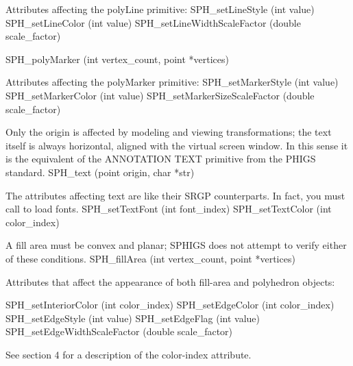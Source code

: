 \newpar
Attributes affecting the polyLine primitive:
\begincode
SPH_setLineStyle (int value)  \elementgenerator  {}
SPH_setLineColor (int value)  \elementgenerator
SPH_setLineWidthScaleFactor (double scale_factor)  \elementgenerator
\endcode


\begincode
SPH_polyMarker (int vertex_count, point *vertices) \elementgenerator
\endcode

\newpar
Attributes affecting the polyMarker primitive:
\begincode
SPH_setMarkerStyle (int value)  \elementgenerator  {}
SPH_setMarkerColor (int value)  \elementgenerator
SPH_setMarkerSizeScaleFactor (double scale_factor)  \elementgenerator
\endcode


Only the origin is affected by modeling and viewing transformations;
the text itself is always horizontal, aligned with the virtual screen
window.  In this sense it is the equivalent of the ANNOTATION TEXT
primitive from the PHIGS standard.
\begincode
SPH_text (point origin, char *str) \elementgenerator
\endcode

\newpar
The attributes affecting text are like their SRGP counterparts.  In fact, you
must call  to load fonts.
\begincode
SPH_setTextFont (int font_index)  \elementgenerator 
SPH_setTextColor (int color_index) \elementgenerator
\endcode



A fill area must be convex and planar; SPHIGS does not attempt to verify either
of these conditions.  
\begincode
SPH_fillArea (int vertex_count, point *vertices) \elementgenerator
\endcode

\newpar
Attributes that affect the appearance of both fill-area and polyhedron objects:

\begincode
SPH_setInteriorColor (int color_index) \elementgenerator
SPH_setEdgeColor (int color_index) \elementgenerator
SPH_setEdgeStyle (int value) \elementgenerator  {}
SPH_setEdgeFlag (int value) \elementgenerator  {}
SPH_setEdgeWidthScaleFactor (double scale_factor) \elementgenerator
\endcode

\newpar
See section 4 for a description of the color-index attribute.


